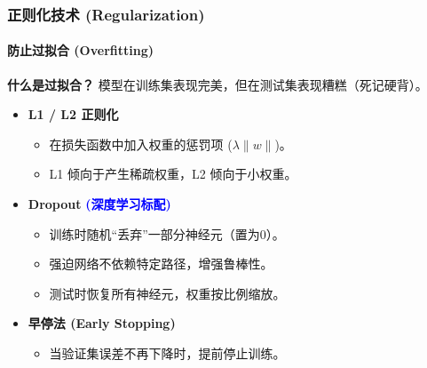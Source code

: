 \documentclass[12pt, t, aspectratio=169]{beamer}
\begin{document}
\begin{frame}
    \frametitle{正则化技术 (Regularization)}
    \framesubtitle{防止过拟合 (Overfitting)}
    
    \textbf{什么是过拟合？} 模型在训练集表现完美，但在测试集表现糟糕（死记硬背）。
    
    \vspace{0.3cm}
    \begin{itemize}
        \item \textbf{L1 / L2 正则化}
        \begin{itemize}
            \item 在损失函数中加入权重的惩罚项 ($\lambda \|w\|$)。
            \item L1 倾向于产生稀疏权重，L2 倾向于小权重。
        \end{itemize}
        
        \item \textbf{Dropout} \textcolor{blue}{\textbf{(深度学习标配)}}
        \begin{itemize}
            \item 训练时随机“丢弃”一部分神经元（置为0）。
            \item 强迫网络不依赖特定路径，增强鲁棒性。
            \item 测试时恢复所有神经元，权重按比例缩放。
        \end{itemize}
        
        \item \textbf{早停法 (Early Stopping)}
        \begin{itemize}
            \item 当验证集误差不再下降时，提前停止训练。
        \end{itemize}
    \end{itemize}
\end{frame}
\end{document}
